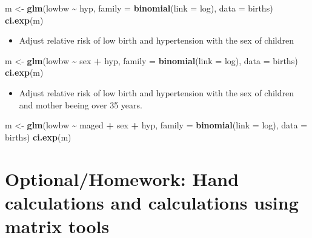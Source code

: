 \documentclass[
]{book}
\newenvironment{Shaded}{\begin{snugshade}}{\end{snugshade}}
\newcommand{\AttributeTok}[1]{\textcolor[rgb]{0.13,0.29,0.53}{#1}}
\newcommand{\FunctionTok}[1]{\textcolor[rgb]{0.13,0.29,0.53}{\textbf{#1}}}
\newcommand{\NormalTok}[1]{#1}
\newcommand{\OtherTok}[1]{\textcolor[rgb]{0.56,0.35,0.01}{#1}}
\newcommand{\SpecialCharTok}[1]{\textcolor[rgb]{0.81,0.36,0.00}{\textbf{#1}}}
\providecommand{\tightlist}{%
  \setlength{\itemsep}{0pt}\setlength{\parskip}{0pt}}
\begin{document}
\begin{Shaded}
\begin{Highlighting}[]
\NormalTok{m }\OtherTok{\textless{}{-}} \FunctionTok{glm}\NormalTok{(lowbw }\SpecialCharTok{\textasciitilde{}}\NormalTok{ hyp, }\AttributeTok{family =} \FunctionTok{binomial}\NormalTok{(}\AttributeTok{link =}\NormalTok{ log), }\AttributeTok{data =}\NormalTok{ births)}
\FunctionTok{ci.exp}\NormalTok{(m)}
\end{Highlighting}
\end{Shaded}

\begin{itemize}
\tightlist
\item
  Adjust relative risk of low birth and hypertension with the sex of children
\end{itemize}

\begin{Shaded}
\begin{Highlighting}[]
\NormalTok{m }\OtherTok{\textless{}{-}} \FunctionTok{glm}\NormalTok{(lowbw }\SpecialCharTok{\textasciitilde{}}\NormalTok{ sex }\SpecialCharTok{+}\NormalTok{ hyp, }\AttributeTok{family =} \FunctionTok{binomial}\NormalTok{(}\AttributeTok{link =}\NormalTok{ log), }\AttributeTok{data =}\NormalTok{ births)}
\FunctionTok{ci.exp}\NormalTok{(m)}
\end{Highlighting}
\end{Shaded}

\begin{itemize}
\tightlist
\item
  Adjust relative risk of low birth and hypertension with the sex of children and mother beeing over 35 years.
\end{itemize}

\begin{Shaded}
\begin{Highlighting}[]
\NormalTok{m }\OtherTok{\textless{}{-}} \FunctionTok{glm}\NormalTok{(lowbw }\SpecialCharTok{\textasciitilde{}}\NormalTok{ maged }\SpecialCharTok{+}\NormalTok{ sex }\SpecialCharTok{+}\NormalTok{ hyp, }\AttributeTok{family =} \FunctionTok{binomial}\NormalTok{(}\AttributeTok{link =}\NormalTok{ log), }\AttributeTok{data =}\NormalTok{ births)}
\FunctionTok{ci.exp}\NormalTok{(m)}
\end{Highlighting}
\end{Shaded}

\section{Optional/Homework: Hand calculations and calculations using matrix tools}\label{optionalhomework-hand-calculations-and-calculations-using-matrix-tools}
\end{document}
